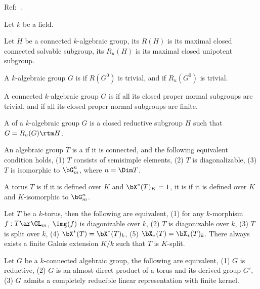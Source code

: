\documentclass[article, a4paper, twoside]{universal}
\begin{document}
\confighead{}{}{}


Ref:~\cite{BT1965}.


\begin{stp}
    Let $k$ be a field.
\end{stp}

\begin{dfn}[0.7, 0.8]
    Let $H$ be a connected $k$-algebraic group, its  $R(H)$ is its maximal closed connected solvable subgroup, its  $R_{u}(H)$ is its maximal closed unipotent subgroup.

    A $k$-algebraic group $G$ is  if $R(G^{0})$ is trivial, and  if $R_{u}(G^{0})$ is trivial.

    A connected $k$-algebraic group $G$ is  if all its closed proper normal subgroups are trivial, and  if all its closed proper normal subgroups are finite.


    A  of a $k$-algebraic group $G$ is a closed reductive subgroup $H$ such that $G=R_{u}(G)\rtm H$.
\end{dfn}

\begin{dfn}
    An algebraic group $T$ is a  if it is connected, and the following equivalent condition holds, (1) $T$ consists of semisimple elements, (2) $T$ is diagonalizable, (3) $T$ is isomorphic to $\bG_{m}^{n}$, where $n=\Dim T$.

    A torus $T$ is  if it is defined over $K$ and $\bX^{*}(T)_{K}=1$, it is  if it is defined over $K$ and $K$-isomorphic to $\bG_{m}^{n}$.
\end{dfn}

\begin{thm}[1.3, 1.5]
    Let $T$ be a $k$-torus, then the following are equivalent, (1) for any $k$-morphism $f:T\ar\GL_{m}$, $\Img(f)$ is diagonizable over $k$, (2) $T$ is diagonizable over $k$, (3) $T$ is split over $k$, (4) $\bX^{*}(T)=\bX^{*}(T)_{k}$, (5) $\bX_{*}(T)=\bX_{*}(T)_{k}$. There always exists a finite Galois extension $K/k$ such that $T$ is $K$-split.
\end{thm}


\begin{thm}[2.2]
    Let $G$ be a $k$-connected algebraic group, the following are equivalent, (1) $G$ is reductive, (2) $G$ is an almost direct product of a torus and its derived group $G'$, (3) $G$ admits a completely reducible linear representation with finite kernel.
\end{thm}



\printref
\end{document}
